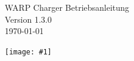 \documentclass[a4paper,10pt]{article}
\title{}
\author{}
\newcommand{\gfx}[1]{\texttt{[image: \#1]}}
\begin{document}
\pagestyle{empty}
\begin{titlepage}
	\vspace*{-3.08cm}
	\colorbox{boxgray}{}
	\vfill
	\begin{center}
		\Huge
		WARP Charger Betriebsanleitung\\\vspace{1cm}
		\large
		Version 1.3.0\\\vspace{0.25cm}
		\today
	\end{center}
	\vfill \gfx{./img/resized/warp_perspective_blue_ready}
\end{titlepage}
\newpage
\null
\newpage
\pagestyle{fancy}
\end{document}
